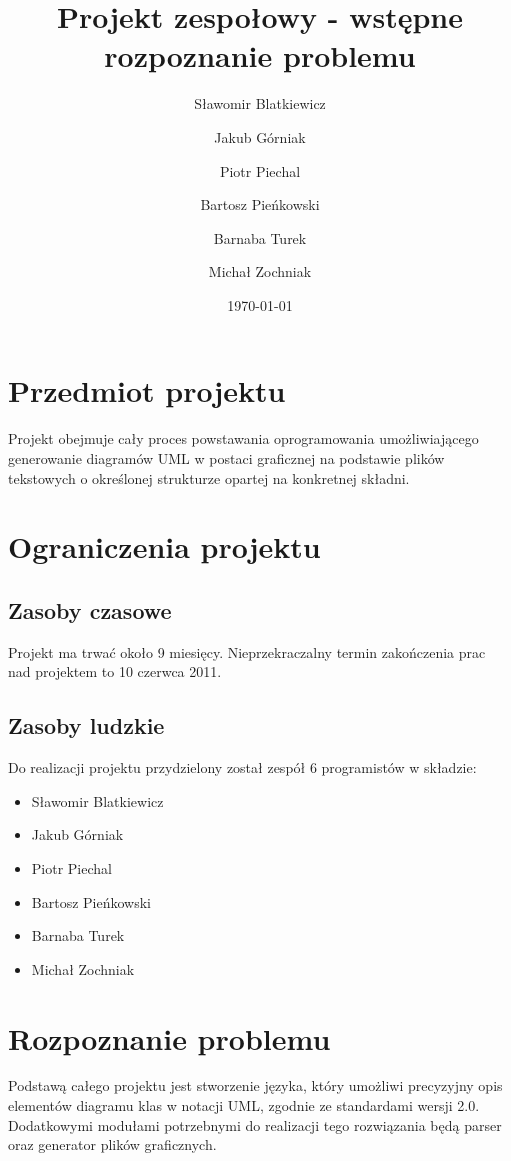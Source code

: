 ﻿\documentclass[a4paper,11pt,notitlepage]{article}
\author{
  Sławomir Blatkiewicz\and
  Jakub Górniak       \and
  Piotr Piechal       \and
  Bartosz Pieńkowski  \and
  Barnaba Turek       \and
  Michał Zochniak
}
\title{Projekt zespołowy - wstępne rozpoznanie problemu}
\date{\today}
\begin{document}
\maketitle %
\tableofcontents
\section{Przedmiot projektu}
Projekt obejmuje cały proces powstawania oprogramowania umożliwiającego generowanie diagramów UML w postaci graficznej na podstawie plików tekstowych o określonej strukturze opartej na konkretnej składni.
\section{Ograniczenia projektu}
\subsection{Zasoby czasowe}
Projekt ma trwać około 9 miesięcy. Nieprzekraczalny termin zakończenia prac nad projektem to 10 czerwca 2011.
\subsection{Zasoby ludzkie}
Do realizacji projektu przydzielony został zespół 6 programistów w składzie:
  \begin{itemize}
    \item{Sławomir Blatkiewicz}
    \item{Jakub Górniak}
    \item{Piotr Piechal}
    \item{Bartosz Pieńkowski}
    \item{Barnaba Turek}
    \item{Michał Zochniak}
  \end{itemize}
\section{Rozpoznanie problemu}
Podstawą całego projektu jest stworzenie języka, który umożliwi precyzyjny opis elementów diagramu klas w notacji UML, zgodnie ze standardami wersji 2.0.
Dodatkowymi modułami potrzebnymi do realizacji tego rozwiązania będą parser oraz generator plików graficznych.
\end{document}
